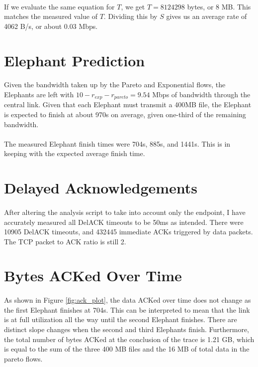 \documentclass{article}
\begin{document}
\paragraph{}
If we evaluate the same equation for $T$, we get $T = 8124298$ bytes, or 8 MB. This matches the measured value of $T$.
Dividing this by $S$ gives us an average rate of 4062 B/s, or about 0.03 Mbps.

\section{Elephant Prediction}

\paragraph{}
Given the bandwidth taken up by the Pareto and Exponential flows, the Elephants are left with $10 - r_{exp} - r_{pareto} = 9.54$ Mbps of bandwidth through the central link.
Given that each Elephant must transmit a 400MB file, the Elephant is expected to finish at about 970s on average, given one-third of the remaining bandwidth.

\paragraph{}
The measured Elephant finish times were 704s, 885s, and 1441s. This is in keeping with the expected average finish time.

\section{Delayed Acknowledgements}
\paragraph{}
After altering the analysis script to take into account only the endpoint, I have accurately measured all DelACK timeouts to be 50ms as intended.
There were 10905 DelACK timeouts, and 432445 immediate ACKs triggered by data packets.
The TCP packet to ACK ratio is still 2.

\section{Bytes ACKed Over Time}
\paragraph{}
As shown in Figure \ref{fig:ack_plot}, the data ACKed over time does not change as the first Elephant finishes at 704s.
This can be interpreted to mean that the link is at full utilization all the way until the second Elephant finishes.
There are distinct slope changes when the second and third Elephants finish.
Furthermore, the total number of bytes ACKed at the conclusion of the trace is 1.21 GB, which is equal to the sum of the three 400 MB files and the 16 MB of total data in the pareto flows.
\end{document}
